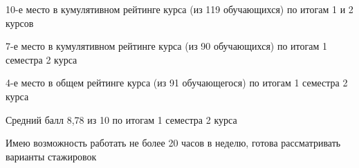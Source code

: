 

\begin{cventries}

\cventry
{} 
{}
{}
{} 
{
 \begin{cvitems}
\item {10-е место в кумулятивном рейтинге курса (из 119 обучающихся) по итогам 1 и 2 курсов}
\item {7-е место в кумулятивном рейтинге курса (из 90 обучающихся) по итогам 1 семестра 2 курса}
\item {4-е место в общем рейтинге курса (из 91 обучающегося) по итогам 1 семестра 2 курса}
\item {Средний балл 8,78 из 10 по итогам 1 семестра 2 курса}
\item {Имею возможность работать не более 20 часов в неделю, готова рассматривать варианты стажировок}
 \end{cvitems}
}

\end{cventries}